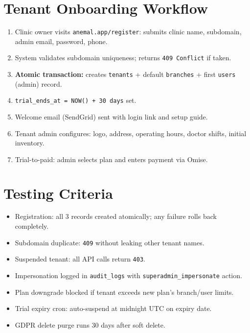 \documentclass[12pt,a4paper]{report}
\newcommand{\testcheck}{\textcolor{successgreen}{\ding{51}}}
\newcommand{\testpending}{\textcolor{warnorange}{$\circ$}}
\begin{document}
\section{Tenant Onboarding Workflow}

\begin{enumerate}
  \item Clinic owner visits \texttt{anemal.app/register}: submits clinic name, subdomain, admin email, password, phone.
  \item System validates subdomain uniqueness; returns \texttt{409 Conflict} if taken.
  \item \textbf{Atomic transaction:} creates \texttt{tenants} + default \texttt{branches} + first \texttt{users} (admin) record.
  \item \texttt{trial\_ends\_at = NOW() + 30 days} set.
  \item Welcome email (SendGrid) sent with login link and setup guide.
  \item Tenant admin configures: logo, address, operating hours, doctor shifts, initial inventory.
  \item Trial-to-paid: admin selects plan and enters payment via Omise.
\end{enumerate}

\section{Testing Criteria}

\begin{itemize}
  \item[\testcheck] Registration: all 3 records created atomically; any failure rolls back completely.
  \item[\testcheck] Subdomain duplicate: \texttt{409} without leaking other tenant names.
  \item[\testcheck] Suspended tenant: all API calls return \texttt{403}.
  \item[\testcheck] Impersonation logged in \texttt{audit\_logs} with \texttt{superadmin\_impersonate} action.
  \item[\testcheck] Plan downgrade blocked if tenant exceeds new plan's branch/user limits.
  \item[\testpending] Trial expiry cron: auto-suspend at midnight UTC on expiry date.
  \item[\testpending] GDPR delete purge runs 30 days after soft delete.
\end{itemize}

\end{document}
